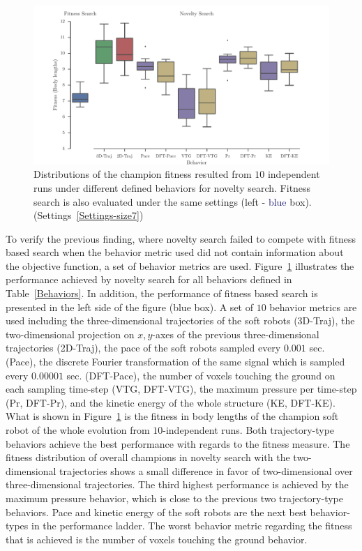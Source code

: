 \begin{figure}[t!]
\centering
\includegraphics[width=1.0\textwidth]{../Figures/Results/BehaviorsPerformance.pdf}
\caption{Distributions of the champion fitness resulted from $10$ independent runs under different defined behaviors for novelty search. Fitness search is also evaluated under the same settings (left - \textcolor{MidnightBlue}{blue} box). (Settings~\ref{Settings-size7})}
\label{fig:BehaviorsPerformance}
\end{figure}

To verify the previous finding, where novelty search failed to compete with fitness based search when the behavior metric used did not contain information about the objective function, a set of behavior metrics are used. Figure~\ref{fig:BehaviorsPerformance} illustrates the performance achieved by novelty search for all behaviors defined in Table~\ref{Behaviors}. In addition, the performance of fitness based search is presented in the left side of the figure (\textcolor{NavyBlue}{blue} box). A set of $10$ behavior metrics are used including the three-dimensional trajectories of the soft robots (3D-Traj), the two-dimensional projection on $x,y$-axes of the previous three-dimensional trajectories (2D-Traj), the pace of the soft robots sampled every $0.001$ sec. (Pace), the discrete Fourier transformation of the same signal which is sampled every $0.00001$ sec. (DFT-Pace), the number of voxels touching the ground on each sampling time-step (VTG, DFT-VTG), the maximum pressure per time-step (Pr, DFT-Pr), and the kinetic energy of the whole structure (KE, DFT-KE). What is shown in Figure~\ref{fig:BehaviorsPerformance} is the fitness in body lengths of the champion soft robot of the whole evolution from $10$-independent runs. Both trajectory-type behaviors achieve the best performance with regards to the fitness measure. The fitness distribution of overall champions in novelty search with the two-dimensional trajectories shows a small difference in favor of two-dimensional over three-dimensional trajectories. The third highest performance is achieved by the maximum pressure behavior, which is close to the previous two trajectory-type behaviors. Pace and kinetic energy of the soft robots are the next best behavior-types in the performance ladder. The worst behavior metric regarding the fitness that is achieved is the number of voxels touching the ground behavior.

